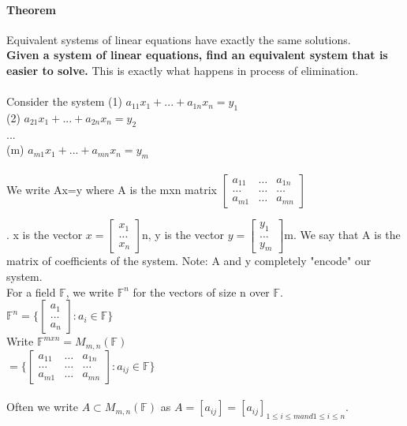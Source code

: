 \documentclass[10pt,letter]{article}
\begin{document}
\paragraph*{Theorem} Equivalent systems of linear equations have exactly the same solutions. \\ 
\textbf{Given a system of linear equations, find an equivalent system that is easier to solve.} This is exactly what happens in process of elimination. \\ \\ 
Consider the system 
(1) $a_{11}x_1 + ... +a_{1n}x_n = y_1$ \\ 
(2) $a_{21}x_1 + ... +a_{2n}x_n = y_2$\\ 
... \\ 
(m) $a_{m1}x_1 + ... +a_{mn}x_n = y_m$ \\\\ 
We write Ax=y where A is the mxn matrix $\begin{bmatrix}
    a_{11}       & \ldots & a_{1n} \\
    \ldots       & \ldots & \ldots \\
    a_{m1}       & \ldots & a_{mn}
\end{bmatrix}$

. x is the vector $x = \begin{bmatrix}
x_1 \\
\ldots \\ 
x_n
\end{bmatrix}$n, y is the vector $y = \begin{bmatrix}
y_1 \\
\ldots \\ 
y_m
\end{bmatrix}$m. We say that A is the matrix of coefficients of the system. Note: A and y completely "encode" our system. \\ 
For a field $\mathbb{F}$, we write $\mathbb{F}^n$ for the vectors of size n over $\mathbb{F}$. \\ 
$\mathbb{F}^n = \{\begin{bmatrix}
a_1 \\
\ldots \\ 
a_n
\end{bmatrix} : a_i \in \mathbb{F}\}$\\ 
Write $\mathbb{F}^{mxn} = M_{m,n}(\mathbb{F})$\\ 
$=\{ \begin{bmatrix}
    a_{11}       & \ldots & a_{1n} \\
    \ldots       & \ldots & \ldots \\
    a_{m1}       & \ldots & a_{mn}
\end{bmatrix}:a_{ij}\in\mathbb{F}\}$\\ \\ 
Often we write $A \subset M_{m,n}(\mathbb{F})$ as $A=[a_{ij}]= [a_{ij}]_{1\leq i\leq m and 1\leq i\leq n}$.
\end{document}
